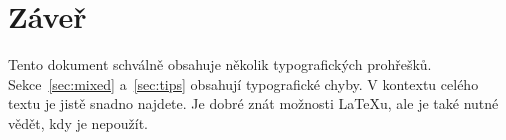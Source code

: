 \documentclass[a4paper, twocolumn, 10pt]{article}
\begin{document}
\section{Záveř}
\label{sec:end}

Tento dokument schválně obsahuje několik typografických prohřešků. Sekce~\ref{sec:mixed} a~\ref{sec:tips} obsahují typografické chyby. V kontextu celého textu je jistě snadno najdete. Je dobré znát možnosti \LaTeX u, ale je také nutné vědět, kdy je nepoužít.
\end{document}
